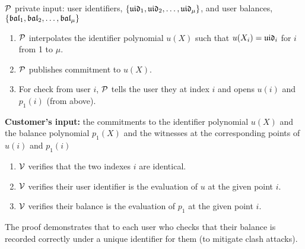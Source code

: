

\begin{Protocol*}[t!]
\begin{framed}
\footnotesize


$\mathcal{P}$ private input: user identifiers, $\{\mathfrak{uid}_1,\mathfrak{uid}_2,\dots,\mathfrak{uid}_\mu\}$, and user balances, $\{\mathfrak{bal}_1,\mathfrak{bal}_2,\dots,\mathfrak{bal}_\mu\}$
\begin{enumerate}
    \item $\mathcal{P}$ interpolates the identifier polynomial $u(X)$ such that $u(X_i)=\mathfrak{uid}_i$ for $i$ from 1 to $\mu$.
    \item $\mathcal{P}$ publishes commitment to $u(X)$.
    \item For check from user $i$, $\mathcal{P}$ tells the user they at index $i$ and opens $u(i)$ and $p_1(i)$ (from \pol above).
\end{enumerate}

\textbf{Customer's input:} the commitments to the identifier polynomial $u(X)$ and the balance polynomial $p_1(X)$ and the witnesses at the corresponding points of $u(i)$ and $p_1(i)$
\begin{enumerate}
    \item $\mathcal{V}$ verifies that the two indexes $i$ are identical.
    \item $\mathcal{V}$ verifies their user identifier is the evaluation of $u$ at the given point $i$.
    \item $\mathcal{V}$ verifies their balance is the evaluation of $p_1$ at the given point $i$.
\end{enumerate}




\normalsize	
\end{framed}
\caption{The \userproof proof demonstrates that to each user who checks that their balance is recorded correctly under a unique identifier for them (to mitigate clash attacks).\label{alg:users}}
\end{Protocol*}